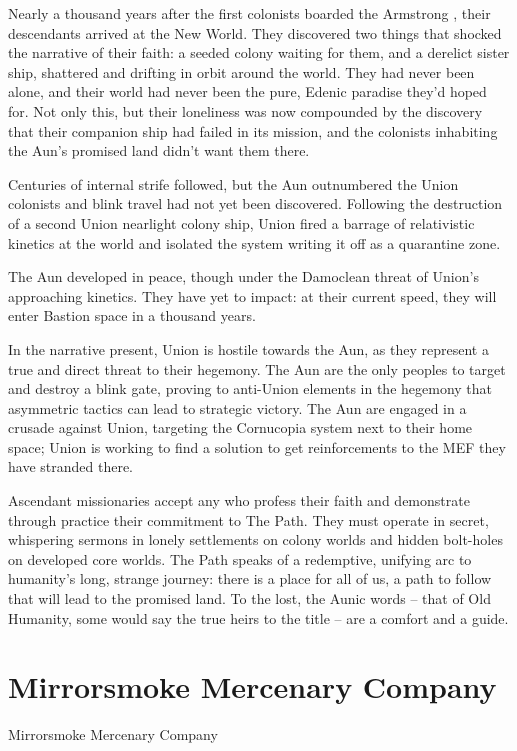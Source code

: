 Nearly a thousand years after the first colonists boarded the Armstrong , their descendants  
arrived at the New World. They discovered two things that shocked the narrative of their faith: a  
seeded colony waiting for them, and a derelict sister ship, shattered and drifting in orbit around  
the world. They had never been alone, and their world had never been the pure, Edenic paradise  
they’d hoped for. Not only this, but their loneliness was now compounded by the discovery that  
their companion ship had failed in its mission, and the colonists inhabiting the Aun’s promised  
land didn’t want them there. 
 

Centuries of internal strife followed, but the Aun outnumbered the Union colonists and blink  
travel had not yet been discovered. Following the destruction of a second Union nearlight colony  
ship, Union fired a barrage of relativistic kinetics at the world and isolated the system writing it  
off as a quarantine zone.
 

The Aun developed in peace, though under the Damoclean threat of Union’s approaching  
kinetics. They have yet to impact: at their current speed, they will enter Bastion space in a  
thousand years. 
 

In the narrative present, Union is hostile towards the Aun, as they represent a true and direct  
threat to their hegemony. The Aun are the only peoples to target and destroy a blink gate,  
proving to anti-Union elements in the hegemony that asymmetric tactics can lead to strategic  
victory. The Aun are engaged in a crusade against Union, targeting the Cornucopia system next  
to their home space; Union is working to find a solution to get reinforcements to the MEF they  
have stranded there. 
 

Ascendant missionaries accept any who profess their faith and demonstrate through practice  
their commitment to The Path. They must operate in secret, whispering sermons in lonely  
settlements on colony worlds and hidden bolt-holes on developed core worlds. The Path speaks  
of a redemptive, unifying arc to humanity’s long, strange journey: there is a place for all of us, a  
path to follow that will lead to the promised land. To the lost, the Aunic words -- that of Old  
Humanity, some would say the true heirs to the title -- are a comfort and a guide.
 
\section{Mirrorsmoke Mercenary Company}
Mirrorsmoke Mercenary Company  

